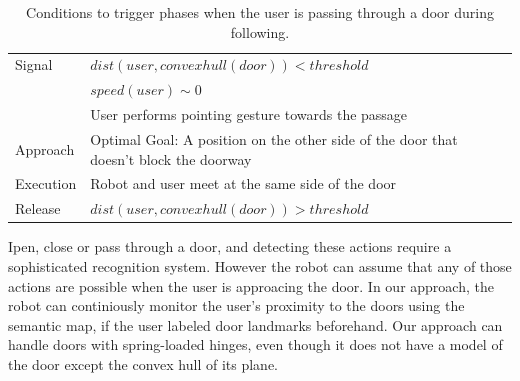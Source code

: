 \begin{table}[H]
	\centering
  \begin{tabular}{l |  m{10cm}}    
    \toprule    
    Signal & {$dist(user, convexhull(door))<threshold$}\\         
    	      & {$speed(user)\sim 0$} \\
	      & {User performs pointing gesture towards the passage}\\ \midrule	                           
    Approach & {Optimal Goal: A position on the other side of the door that doesn't block the doorway}\\       \midrule
    Execution & {Robot and user meet at the same side of the door}\\  \midrule
    Release & {$dist(user, convexhull(door))>threshold$ }\\ 
    \bottomrule
  \end{tabular}
      \caption{Conditions to trigger phases when the user is passing through a door during following.}
    \label{table:situation_aware_list_group}
\end{table}


Ipen, close or pass through a door, and detecting these actions require a sophisticated recognition system. However the robot can assume that any of those actions are possible when the user is approacing the door. In our approach, the robot can continiously monitor the user's proximity to the doors using the semantic map, if the user labeled door landmarks beforehand. Our approach can handle doors with spring-loaded hinges, even though it does not have a model of the door except the convex hull of its plane.


